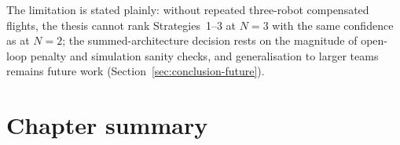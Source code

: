 The limitation is stated plainly: without repeated three-robot compensated flights, the thesis
cannot rank Strategies~1--3 at $N=3$ with the same confidence as at $N=2$; the summed-architecture
decision rests on the magnitude of open-loop penalty and simulation sanity checks, and generalisation
to larger teams remains future work (Section~\ref{sec:conclusion-future}).

\section{Chapter summary}
\label{sec:res3-summary}

